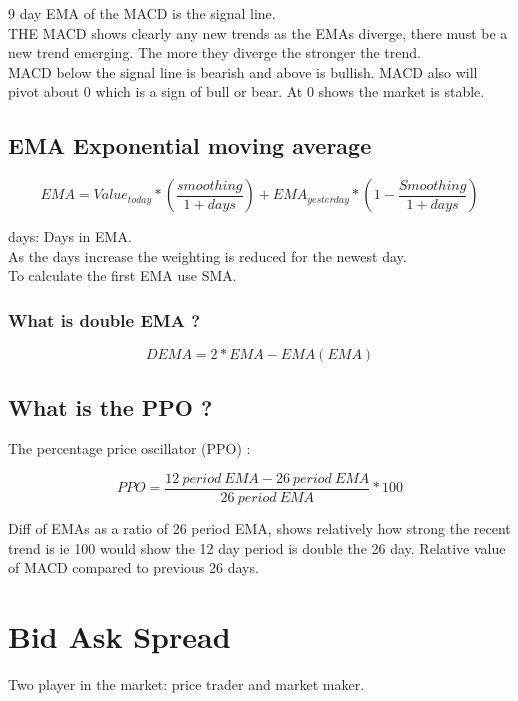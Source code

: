 \documentclass[11pt]{scrartcl} %
\begin{document}
9 day EMA of the MACD is the signal line.\\

THE MACD shows clearly any new trends as the EMAs diverge, there must be a new trend emerging. The 
more they diverge the stronger the trend.\\

MACD below the signal line is bearish and above is bullish. MACD also will pivot about 0 which is a sign
of bull or bear. At 0 shows the market is stable.

\subsection{EMA Exponential moving average}

\[ EMA = Value_{today} *(\frac{smoothing}{1 + days}) + EMA_{yesterday}*(1-\frac{Smoothing}{1+days}) \]

days: Days in EMA.\\

As the days increase the weighting is reduced for the newest day.\\

To calculate the first EMA use SMA.

\subsubsection{What is double EMA ?}

\[ DEMA = 2*EMA - EMA(EMA) \]

\subsection{What is the PPO ?}

The percentage price oscillator (PPO) :

\[ PPO = \frac{12\:period\:EMA - 26\:period\:EMA}{26\:period\:EMA} *100 \]

Diff of EMAs as a ratio of 26 period EMA, shows relatively how strong the recent trend is ie 100 would
show the 12 day period is double the 26 day. Relative value of MACD compared to previous 26 days.

\section{Bid Ask Spread}

Two player in the market: price trader and market maker.\\
\end{document}
